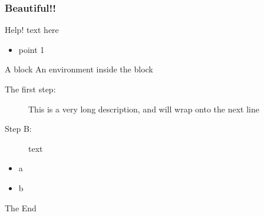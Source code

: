 \documentclass{beamer}
\begin{document}
	\begin{frame}
		\frametitle{Beautiful!!}
        \begin{alertblock}{Help!}
            text here
            \begin{itemize}
            \item point 1
            \end{itemize}
        \end{alertblock}
        
        \begin{block}{A block}
            An environment inside the block
            \begin{description}
            \item[The first step:] This is a very long description, and will wrap onto
              the next line
            \item[Step B:] text
            \end{description}
        
            \begin{itemize}
            \item a
            \item b
            \end{itemize}
          \end{block}
	\end{frame}
	
	
	
	
	
	
	\begin{frame}
	    \centering
		\huge{The End}
	\end{frame}
	
\end{document}
